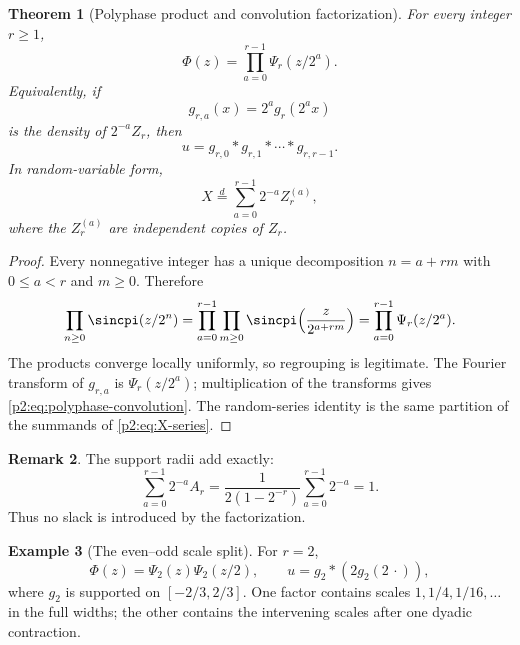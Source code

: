 \documentclass[11pt,oneside]{article}
\newtheorem{theorem}{Theorem}[section]
\theoremstyle{definition}
\newtheorem{remark}[theorem]{Remark}
\newtheorem{example}[theorem]{Example}
\begin{document}
\begin{theorem}[Polyphase product and convolution factorization]
\label{p2:thm:polyphase-main}
For every integer $r\ge1$,
\begin{equation}
 \boxed{\displaystyle
 \Phi(z)=\prod_{a=0}^{r-1}\Psi_r(z/2^a).}                  \label{p2:eq:polyphase-product}
\end{equation}
Equivalently, if
\begin{equation}
 g_{r,a}(x)=2^a g_r(2^a x)                                 \label{p2:eq:scaled-gr}
\end{equation}
 is the density of $2^{-a}Z_r$, then
\begin{equation}
 \boxed{\displaystyle
 u=g_{r,0}*g_{r,1}*\cdots*g_{r,r-1}.}                       \label{p2:eq:polyphase-convolution}
\end{equation}
In random-variable form,
\begin{equation}
 X\overset{d}=\sum_{a=0}^{r-1}2^{-a}Z_r^{(a)},              \label{p2:eq:polyphase-random}
\end{equation}
where the $Z_r^{(a)}$ are independent copies of $Z_r$.
\end{theorem}

\begin{proof}
Every nonnegative integer has a unique decomposition $n=a+rm$ with
$0\le a<r$ and $m\ge0$.  Therefore
\[
 \prod_{n\ge0}\sincpi(z/2^n)
 =\prod_{a=0}^{r-1}\prod_{m\ge0}
   \sincpi\!\left(\frac{z}{2^{a+rm}}\right)
 =\prod_{a=0}^{r-1}\Psi_r(z/2^a).
\]
The products converge locally uniformly, so regrouping is legitimate.  The
Fourier transform of $g_{r,a}$ is $\Psi_r(z/2^a)$; multiplication of the
transforms gives \eqref{p2:eq:polyphase-convolution}.  The random-series identity
is the same partition of the summands of \eqref{p2:eq:X-series}.
\end{proof}

\begin{remark}
The support radii add exactly:
\begin{equation}
 \sum_{a=0}^{r-1}2^{-a}A_r
 =\frac{1}{2(1-2^{-r})}\sum_{a=0}^{r-1}2^{-a}=1.            \label{p2:eq:support-adds}
\end{equation}
Thus no slack is introduced by the factorization.
\end{remark}

\begin{example}[The even--odd scale split]
For $r=2$,
\begin{equation}
 \Phi(z)=\Psi_2(z)\Psi_2(z/2),
 \qquad
 u=g_2*(2g_2(2\,\cdot)),                                   \label{p2:eq:r2-factorization}
\end{equation}
where $g_2$ is supported on $[-2/3,2/3]$.  One factor contains scales
$1,1/4,1/16,\ldots$ in the full widths; the other contains the intervening
scales after one dyadic contraction.
\end{example}
\end{document}
